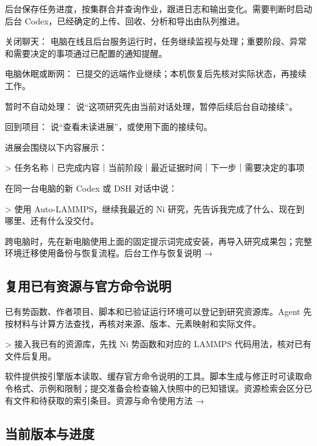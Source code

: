 \documentclass[11pt,a4paper]{ctexart}
\begin{document}
后台保存任务进度，按集群合并查询作业，跟进日志和输出变化。需要判断时启动后台 Codex，已经确定的上传、回收、分析和导出由队列推进。



\noindent\textbullet\quad 关闭聊天： 电脑在线且后台服务运行时，任务继续监视与处理；重要阶段、异常和需要决定的事项通过已配置的通知提醒。


\noindent\textbullet\quad 电脑休眠或断网： 已提交的远端作业继续；本机恢复后先核对实际状态，再接续工作。


\noindent\textbullet\quad 暂时不自动处理： 说“这项研究先由当前对话处理，暂停后续后台自动接续”。


\noindent\textbullet\quad 回到项目： 说“查看未读进展”，或使用下面的接续句。




进展会围绕以下内容展示：



> 任务名称｜已完成内容｜当前阶段｜最近证据时间｜下一步｜需要决定的事项



在同一台电脑的新 Codex 或 DSH 对话中说：



> 使用 Auto-LAMMPS，继续我最近的 Ni 研究，先告诉我完成了什么、现在到哪里、还有什么没交付。



跨电脑时，先在新电脑使用上面的固定提示词完成安装，再导入研究成果包；完整环境迁移使用备份与恢复流程。后台工作与恢复说明 →



\subsection{复用已有资源与官方命令说明}


已有势函数、作者项目、脚本和已验证运行环境可以登记到研究资源库。Agent 先按材料与计算方法查找，再核对来源、版本、元素映射和实际文件。



> 接入我已有的资源库，先找 Ni 势函数和对应的 LAMMPS 代码用法，核对已有文件后复用。



软件提供按引擎版本读取、缓存官方命令说明的工具。脚本生成与修正时可读取命令格式、示例和限制；提交准备会检查输入快照中的已知错误。资源检索会区分已有文件和待获取的索引条目。资源与命令使用方法 →



\subsection{当前版本与进度}
\end{document}
